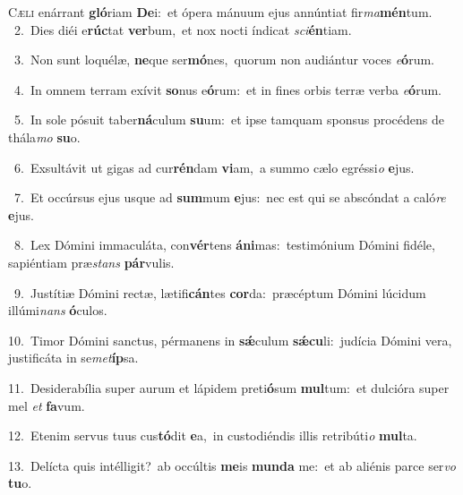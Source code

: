 \lettrine{\initial\textcolor{\initialcolor}{C}}{æli} enárrant \textbf{gló}\-riam \textbf{De}\-i:~\star et ópera mánuum ejus annúntiat fir\-\textit{ma}\-\textbf{mén}tum.\\
{\numbfont\textcolor{\numbcolor}{~2.}}~Dies diéi e\-\textbf{rúc}\-tat \textbf{ver}\-bum,~\star et nox nocti índicat \textit{sci}\-\textbf{én}tiam.\par
{\numbfont\textcolor{\numbcolor}{~3.}}~Non sunt loquélæ, \textbf{ne}\-que ser\-\textbf{mó}\-nes,~\star quorum non audiántur voces \textit{e}\-\textbf{ó}rum.\par
{\numbfont\textcolor{\numbcolor}{~4.}}~In omnem terram exívit \textbf{so}\-nus e\-\textbf{ó}\-rum:~\star et in fines orbis terræ verba \textit{e}\-\textbf{ó}rum.\par
{\numbfont\textcolor{\numbcolor}{~5.}}~In sole pósuit taber\-\textbf{ná}\-culum \textbf{su}\-um:~\star et ipse tamquam sponsus procédens de thála\textit{mo} \textbf{su}\-o.\par
{\numbfont\textcolor{\numbcolor}{~6.}}~Exsultávit ut gigas ad cur\-\textbf{rén}\-dam \textbf{vi}\-am,~\star a summo cælo egréssi\textit{o} \textbf{e}\-jus.\par
{\numbfont\textcolor{\numbcolor}{~7.}}~Et occúrsus ejus usque ad \textbf{sum}\-mum \textbf{e}\-jus:~\star nec est qui se abscóndat a caló\textit{re} \textbf{e}\-jus.\par
{\numbfont\textcolor{\numbcolor}{~8.}}~Lex Dómini immaculáta, con\-\textbf{vér}\-tens \textbf{á}\-\textbf{ni}mas:~\star testimónium Dómini fidéle, sapiéntiam præ\textit{stans} \textbf{pár}\-vulis.\par
{\numbfont\textcolor{\numbcolor}{~9.}}~Justítiæ Dómini rectæ, lætifi\-\textbf{cán}\-tes \textbf{cor}\-da:~\star præcéptum Dómini lúcidum illúmi\textit{nans} \textbf{ó}\-culos.\par
{\numbfont\textcolor{\numbcolor}{10.}}~Timor Dómini sanctus, pérmanens in \textbf{sǽ}\-culum \textbf{sǽ}\-\textbf{cu}li:~\star judícia Dómini vera, justificáta in se\-\textit{met}\-\textbf{íp}sa.\par
{\numbfont\textcolor{\numbcolor}{11.}}~Desiderabília super aurum et lápidem preti\-\textbf{ó}\-sum \textbf{mul}\-tum:~\star et dulcióra super mel \textit{et} \textbf{fa}\-vum.\par
{\numbfont\textcolor{\numbcolor}{12.}}~Etenim servus tuus cus\-\textbf{tó}\-dit \textbf{e}\-a,~\star in custodiéndis illis retribúti\textit{o} \textbf{mul}\-ta.\par
{\numbfont\textcolor{\numbcolor}{13.}}~Delícta quis intélligit?~\dagger ab occúltis \textbf{me}\-is \textbf{mun}\-\textbf{da} me:~\star et ab aliénis parce ser\textit{vo} \textbf{tu}\-o.\par
